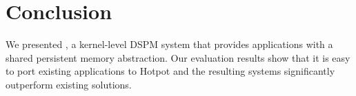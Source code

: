 \section{Conclusion}
\label{sec:hotpot:conclude}

We presented \hotpot, a kernel-level DSPM system that provides applications
with a shared persistent memory abstraction. Our evaluation results show that
it is easy to port existing applications to Hotpot and the resulting systems
significantly outperform existing solutions.
